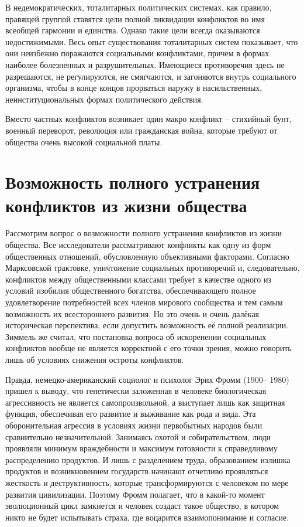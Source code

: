 В недемократических, тоталитарных политических системах, как правило, правящей
группой ставятся цели полной ликвидации конфликтов во имя всеобщей гармонии и
единства. Однако такие цели всегда оказываются недостижимыми. Весь опыт
существования тоталитарных систем показывает, что они неизбежно поражаются
социальными конфликтами, причем в формах наиболее болезненных и разрушительных.
Имеющиеся противоречия здесь не разрешаются, не регулируются, не смягчаются, и
загоняются внутрь социального организма, чтобы в конце концов прорваться наружу
в насильственных, неинституциональных формах политического действия.

Вместо частных конфликтов возникает один макро конфликт -- стихийный бунт,
военный переворот, революция или гражданская война, которые требуют от общества
очень высокой социальной платы.

\pagebreak %

\chapter{Возможность полного устранения конфликтов из жизни общества}

Рассмотрим вопрос о возможности полного устранения конфликтов из жизни
общества. Все исследователи рассматривают конфликты как одну из форм
общественных отношений, обусловленную объективными факторами. Согласно
Марксовской трактовке, уничтожение социальных противоречий и, следовательно,
конфликтов между общественными классами требует в качестве одного из условий
изобилия общественного богатства, обеспечивающего полное удовлетворение
потребностей всех членов мирового сообщества и тем самым возможность их
всестороннего развития. Но это очень и очень далёкая историческая перспектива,
если допустить возможность её полной реализации. Зиммель же считал, что
постановка вопроса об искоренении социальных конфликтов вообще не является
корректной с его точки зрения, можно говорить лишь об условиях снижения остроты
конфликтов.

Правда, немецко-американский социолог и психолог Эрих Фромм \linebreak (1900--%
1980) пришел к выводу, что генетически заложенная в человеке биологическая
агрессивность не является самопроизвольной, а выступает лишь как защитная
функция, обеспечивая его развитие и выживание как рода и вида. Эта
оборонительная агрессия в условиях жизни первобытных народов были сравнительно
незначительной. Занимаясь охотой и собирательством, люди проявляли минимум
враждебности и максимум готовности к справедливому распределению продуктов. И
лишь с разделением труда, образованием излишка продуктов и возникновением
государств начинают отчетливо проявляться жесткость и деструктивность, которые
трансформируются с человеком по мере развития цивилизации. Поэтому Фромм
полагает, что в какой-то момент эволюционный цикл замкнется и человек создаст
такое общество, в котором никто не будет испытывать страха, где воцарится
взаимопонимание и согласие.

